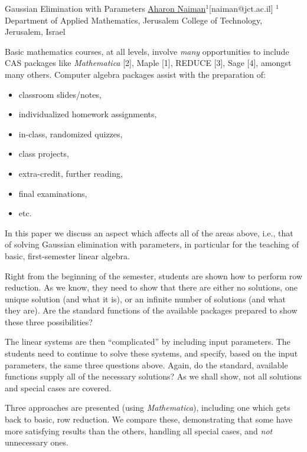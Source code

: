 


\begin{abstract_online}{Gaussian Elimination with Parameters}{%
        \underline{Aharon Naiman}$^{1}$}{[naiman@jct.ac.il]
        }{%
        $^1$ Department of Applied Mathematics, Jerusalem College of
    Technology, Jerusalem, Israel}
    
Basic mathematics courses, at all levels, involve \textit{many}
opportunities to include CAS packages like \emph{Mathematica} [2],
Maple [1], REDUCE [3], Sage [4], amongst many others.  Computer
algebra packages assist with the preparation of:
%
\begin{itemize}
    \item classroom slides/notes,
    \item individualized homework assignments,
    \item in-class, randomized quizzes,
    \item class projects,
    \item extra-credit, further reading,
    \item final examinations,
    \item etc.
\end{itemize}
%
In this paper we discuss an aspect which affects all of the areas
above, i.e., that of solving Gaussian elimination with parameters, in
particular for the teaching of basic, first-semester linear algebra.

Right from the beginning of the semester, students are shown how to
perform row reduction.  As we know, they need to show that there are
either no solutions, one unique solution (and what it is), or an
infinite number of solutions (and what they are).  Are the standard
functions of the available packages prepared to show these three
possibilities?

The linear systems are then ``complicated'' by including input
parameters.  The students need to continue to solve these systems, and
specify, based on the input parameters, the same three questions
above.  Again, do the standard, available functions supply all of the
necessary solutions?  As we shall show, not all solutions and special
cases are covered.

Three approaches are presented (using \emph{Mathematica}), including
one which gets back to basic, row reduction.  We compare these,
demonstrating that some have more satisfying results than the others,
handling all special cases, and \emph{not} unnecessary ones.


\end{abstract_online}
